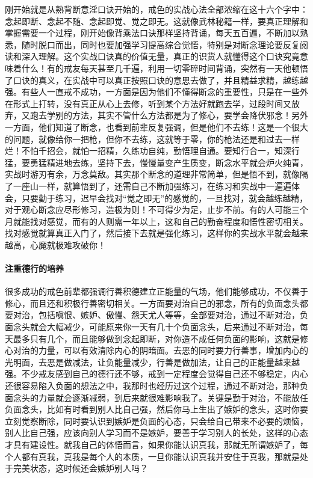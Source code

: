 刚开始就是从熟背断意淫口诀开始的，戒色的实战心法全部浓缩在这十六个字中：念起即断、念起不随、念起即觉、觉之即无。这就像武林秘籍一样，要真正理解和掌握需要一个过程，刚开始像背乘法口诀那样坚持背诵，每天五百遍，不断加以熟悉，随时脱口而出，同时也要加强学习提高综合觉悟，特别是对断念理论要反复阅读和深入理解。这个实战口诀真的价值无量，真正的识货人就懂得这个口诀究竟意味着什么！有的戒友每天甚至几千遍，利用一切零碎时间背诵，突然有一天他顿悟了口诀的真义，在实战中可以真正按照口诀的意思去做了，并且精益求精，越练越强。有些人一直戒不成功，一方面是因为他们不懂得断念的重要性，只是在一些外在形式上打转，没有真正从心上去修，听到某个方法好就跑去学，过段时间又放弃，又跑去学别的方法，其实不管什么方法都是为了修心，要学会降伏邪念！另外一方面，他们知道了断念，也看到前辈反复强调，但是他们不去练！这是一个很大的问题，就像给你一把枪，但你不去练，这就等于零，你的枪法还是和过去一样烂！不怕千招会，就怕一招精，久练功自纯，勤悟理自通。要知行合一，知深行猛，要勇猛精进地去练，坚持下去，慢慢量变产生质变，断念水平就会炉火纯青，实战时游刃有余，万念莫敌。其实那个断念的道理非常简单，但是悟不到，就像隔了一座山一样，就算悟到了，还需自己不断加强练习，在练习和实战中一遍遍体会，只要勤于练习，迟早会找对“觉之即无”的感觉的，一旦找对，就会越练越精，对于观心断念应尽形修习，造极为则！不可得少为足，止步不前。有的人可能三个月就能找对感觉，而有的人则需一年以上，这和自己的勤奋程度和悟性密切相关。找对感觉就算真正入门了，然后接下去就是强化练习，这样你的实战水平就会越来越高，心魔就极难攻破你！

\paragraph{注重德行的培养}

很多成功的戒色前辈都强调行善积德建立正能量的气场，他们能够成功，不仅善于修心，而且还和积极行善密切相关。一方面要对治自己的邪念，所有的负面念头都要对治，包括嗔恨、嫉妒、傲慢、怨天尤人等等，全部要对治，通过不断对治，负面念头就会大幅减少，可能原来你一天有几十个负面念头，后来通过不断对治，每天最多只有几个，而且能够做到念起即断，对你造不成任何负面的影响，这就是修心对治的力量，可以有效清除内心的阴暗面。去恶的同时要力行善事，增加内心的光明面，去恶是做减法，让负能量减少，行善是做加法，让自己的正能量越来越强。不少戒友感到自己的德行还不够，戒到一定程度会觉得自己还不够稳定，内心还很容易陷入负面的想法之中，我那时也经历过这个过程，通过不断对治，那种负面念头的力量就会逐渐减弱，到后来就很难影响我了。关键是勤于对治，不能放任负面念头，比如有时看到别人比自己强，然后你马上生出了嫉妒的念头，这时你要立刻觉察断除，同时要认识到嫉妒是负面的心态，只会给自己带来不必要的烦恼，别人比自己强，应该向别人学习而不是嫉妒，要善于学习别人的长处，这样的心态才具有建设性。就我自己的体悟而言，如果你能认识真我，那就无所谓嫉妒了，每个人都有真我，真我是每个人的本质，一旦你能认识真我并安住于真我，那就是处于完美状态，这时候还会嫉妒别人吗？

